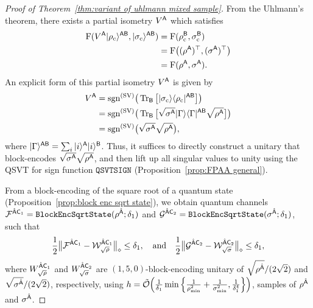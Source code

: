 




\begin{proof}[Proof of Theorem~\ref{thm:variant of uhlmann mixed sample}]
    
From the Uhlmann's theorem,  there exists a partial isometry $V^{\mathsf{A}}$ which satisfies
\begin{align}
\label{inteq:49}
    {\mathrm{F}}(V^{\mathsf{A}}|\rho_{\rm c}\rangle^{{\mathsf{A}}{\mathsf{B}}}, |\sigma_{\rm c}\rangle^{{\mathsf{A}}{\mathsf{B}}}) 
    &= {\mathrm{F}}(\rho_{\rm c}^{{\mathsf{B}}}, \sigma_{\rm c}^{{\mathsf{B}}}) \\
    &= {\mathrm{F}}\big((\rho^{\mathsf{A}})^\top, (\sigma^{\mathsf{A}})^\top\big) \\
    \label{inteq:129}
    &= {\mathrm{F}}(\rho^{\mathsf{A}}, \sigma^{\mathsf{A}}).
\end{align}
An explicit form of this partial isometry $V^{\mathsf{A}}$ is given by 
\begin{align}
    V^{\mathsf{A}} 
    &= \mathrm{sgn}^{(\rm SV)}\big(\operatorname{Tr}_{\mathsf{B}}\big[|\sigma_{\rm c}\rangle\langle\rho_{\rm c}|^{{\mathsf{A}}{\mathsf{B}}}\big]\big) \\
    &= \mathrm{sgn}^{(\rm SV)}\big(\operatorname{Tr}_{\mathsf{B}}\big[\sqrt{\sigma^{\mathsf{A}}}|\Gamma\rangle\langle\Gamma|^{{\mathsf{A}}{\mathsf{B}}}\sqrt{\rho^{\mathsf{A}}}\big]\big) \\
    &= \mathrm{sgn}^{(\rm SV)}\big(\sqrt{\sigma^{\mathsf{A}}}\sqrt{\rho^{\mathsf{A}}}\big),
\end{align}
where $|\Gamma\rangle^{{\mathsf{A}}{\mathsf{B}}} = \sum_i|i\rangle^{\mathsf{A}}|i\rangle^{\mathsf{B}}$.
Thus, it suffices to directly construct a unitary that block-encodes $\sqrt{\sigma^{\mathsf{A}}}\sqrt{\rho^{\mathsf{A}}}$, and then lift up all singular values to unity using the QSVT for sign function $\mathtt{QSVTSIGN}$ (Proposition~\ref{prop:FPAA general}).


From a block-encoding of the square root of a quantum state (Proposition~\ref{prop:block enc sqrt state}), we obtain quantum channels ${\mathcal{F}}^{\hat{{\mathsf{A}}}{\mathsf{C}}_1} = \mathtt{BlockEncSqrtState}(\rho^{\hat{{\mathsf{A}}}}; \delta_1)$ and ${\mathcal{G}}^{\hat{{\mathsf{A}}}{\mathsf{C}}_2} = \mathtt{BlockEncSqrtState}(\sigma^{\hat{{\mathsf{A}}}}; \delta_1)$, such that
\begin{align}
\label{inteq:127}
    \f{1}{2}\big\|\cF^{\hat{\sA}\sC_1} - \cW_{\sqrt{\rho}}^{\hat{\sA}\sC_1}\big\|_\diamond \leq \delta_1, \ \ \ \text{and} \ \ \
    \f{1}{2}\big\|\cG^{\hat{\sA}\sC_2} - \cW_{\sqrt{\sigma}}^{\hat{\sA}\sC_2}\big\|_\diamond \leq \delta_1,
\end{align}
where $W_{\sqrt{\rho}}^{\hat{{\mathsf{A}}}{\mathsf{C}}_1}$ and $W_{\sqrt{\sigma}}^{\hat{{\mathsf{A}}}{\mathsf{C}}_2}$ are $(1, 5, 0)$-block-encoding unitary of $\sqrt{\rho^{\hat{{\mathsf{A}}}}}/(2\sqrt{2})$ and $\sqrt{\sigma^{\hat{{\mathsf{A}}}}}/(2\sqrt{2})$, respectively, using $h = \tilde{{\mathcal{O}}}\Big(\frac{1}{\delta_1}\min\Big\{\frac{1}{\rho_{\rm min}^2} + \frac{1}{\sigma_{\rm min}^2}, \frac{1}{\delta_1^4}\Big\}\Big)$, samples of $\rho^{\hat{{\mathsf{A}}}}$ and $\sigma^{\hat{{\mathsf{A}}}}$.


\end{proof}
